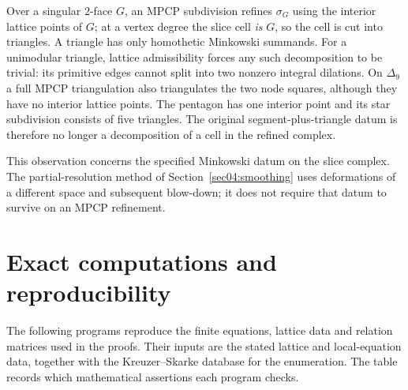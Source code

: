 \documentclass[11pt]{amsart}
\theoremstyle{definition}
\theoremstyle{remark}
\theoremstyle{plain}
\begin{document}
Over a singular $2$-face $G$, an MPCP subdivision refines $\sigma_G$ using the
interior lattice points of $G$; at a vertex degree the slice cell \emph{is} $G$,
so the cell is cut into triangles.  A triangle has only homothetic Minkowski summands.  For a
unimodular triangle, lattice admissibility forces any such decomposition
to be trivial: its primitive edges cannot split into two nonzero
integral dilations.  On $\Delta_9$ a full MPCP triangulation also
triangulates the two node squares, although they have no interior
lattice points.  The pentagon has one interior point and its star
subdivision consists of five triangles.  The original
segment-plus-triangle datum is therefore no longer a decomposition
of a cell in the refined complex.

This observation concerns the specified Minkowski datum on the slice
complex.  The partial-resolution method of Section~\ref{sec04:smoothing}
uses deformations of a different space and subsequent blow-down; it
does not require that datum to survive on an MPCP refinement.

\section{Exact computations and reproducibility}\label{app:cert}

The following programs reproduce the finite equations, lattice data
and relation matrices used in the proofs.  Their inputs are the stated
lattice and local-equation data, together with the Kreuzer--Skarke
database for the enumeration.  The table records which
mathematical assertions each program checks.
\end{document}
